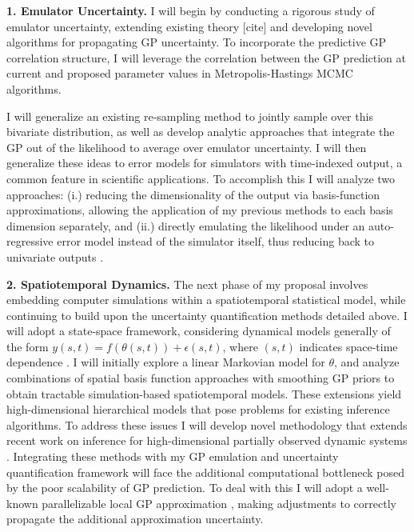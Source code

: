 \documentclass[11pt]{article}
\begin{document}
 \textbf{1. Emulator Uncertainty.} I will begin by conducting a rigorous study of emulator uncertainty, extending existing theory [cite] and developing novel algorithms for propagating GP uncertainty. To incorporate the predictive GP correlation structure, I will leverage the correlation between the GP prediction at current and proposed parameter values in Metropolis-Hastings MCMC algorithms. 
 
 I will generalize an existing re-sampling method \cite{Fer} to jointly sample over this bivariate distribution, as well as develop analytic approaches that integrate the GP out of the likelihood to average over emulator uncertainty. 
I will then generalize these ideas to error models for simulators with time-indexed output, a common feature in scientific applications. To accomplish this I will analyze two approaches: (i.) reducing the dimensionality of the output via basis-function 
 approximations, allowing the application of my previous methods to each basis dimension separately, and (ii.) directly emulating the likelihood under an auto-regressive error model instead of the simulator itself, thus reducing back to univariate outputs \cite{Fer}. 

 \textbf{2. Spatiotemporal Dynamics.}
 The next phase of my proposal involves embedding computer simulations within a spatiotemporal statistical model, while continuing to build upon the uncertainty quantification methods detailed above. I will adopt a state-space framework, considering dynamical models generally of the form $y(s, t) = f(\theta(s, t)) + \epsilon(s, t)$, where $(s, t)$ indicates space-time dependence \cite{Wikle, Hefley}. I will initially explore a linear Markovian model for $\theta$, and analyze combinations of spatial basis function approaches with smoothing GP priors to obtain tractable simulation-based spatiotemporal models. 
These extensions yield high-dimensional hierarchical models that pose problems for existing inference algorithms. To address these issues I will develop novel methodology that extends recent work on inference for high-dimensional partially observed dynamic systems \cite{Park}. Integrating these methods with my GP emulation and uncertainty quantification framework will face the additional computational bottleneck posed by the poor scalability of GP prediction. To deal with this I will adopt a well-known parallelizable local GP approximation \cite{Gramacy}, making adjustments to correctly propagate the additional approximation uncertainty. 
\end{document}
